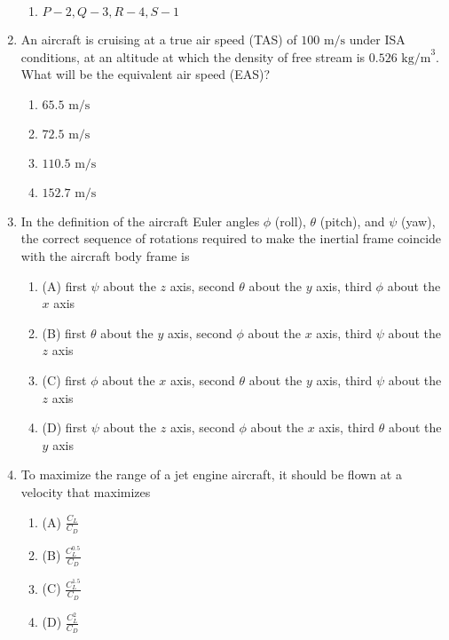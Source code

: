 \documentclass[journal]{IEEEtran}
\begin{document}
\begin{enumerate}[start=35]
\begin{enumerate}
    \item $P-2, Q-3, R-4, S-1$
\end{enumerate}
\item An aircraft is cruising at a true air speed (TAS) of $100 \text{ m/s}$ under ISA conditions, at an altitude at which the density of free stream is $0.526 \text{ kg/m}^3$. What will be the equivalent air speed (EAS)?
\begin{enumerate}
    \item $65.5 \text{ m/s}$
    \item $72.5 \text{ m/s}$
    \item $110.5 \text{ m/s}$
    \item $152.7 \text{ m/s}$
\end{enumerate}
\item In the definition of the aircraft Euler angles $\phi$ (roll), $\theta$ (pitch), and $\psi$ (yaw), the correct sequence of rotations required to make the inertial frame coincide with the aircraft body frame is
\begin{enumerate}
    \item (A) first $\psi$ about the $z$ axis, second $\theta$ about the $y$ axis, third $\phi$ about the $x$ axis
    \item (B) first $\theta$ about the $y$ axis, second $\phi$ about the $x$ axis, third $\psi$ about the $z$ axis
    \item (C) first $\phi$ about the $x$ axis, second $\theta$ about the $y$ axis, third $\psi$ about the $z$ axis
    \item (D) first $\psi$ about the $z$ axis, second $\phi$ about the $x$ axis, third $\theta$ about the $y$ axis
\end{enumerate}

\item To maximize the range of a jet engine aircraft, it should be flown at a velocity that maximizes
\begin{enumerate}
    \item (A) $\frac{C_L}{C_D}$
    \item (B) $\frac{C_{L}^{0.5}}{C_D}$
    \item (C) $\frac{C_{L}^{1.5}}{C_D}$
    \item (D) $\frac{C_{L}^{2}}{C_{D}}$
\end{enumerate}


\end{enumerate}
\end{document}
